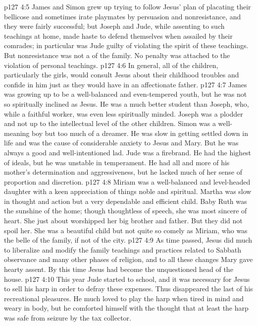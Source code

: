 \vs p127 4:5 James and Simon grew up trying to follow Jesus’ plan of placating their bellicose and sometimes irate playmates by persuasion and nonresistance, and they were fairly successful; but Joseph and Jude, while assenting to such teachings at home, made haste to defend themselves when assailed by their comrades; in particular was Jude guilty of violating the spirit of these teachings. But nonresistance was not a  of the family. No penalty was attached to the violation of personal teachings.
\vs p127 4:6 In general, all of the children, particularly the girls, would consult Jesus about their childhood troubles and confide in him just as they would have in an affectionate father.
\vs p127 4:7 James was growing up to be a well\hyp{}balanced and even\hyp{}tempered youth, but he was not so spiritually inclined as Jesus. He was a much better student than Joseph, who, while a faithful worker, was even less spiritually minded. Joseph was a plodder and not up to the intellectual level of the other children. Simon was a well\hyp{}meaning boy but too much of a dreamer. He was slow in getting settled down in life and was the cause of considerable anxiety to Jesus and Mary. But he was always a good and well\hyp{}intentioned lad. Jude was a firebrand. He had the highest of ideals, but he was unstable in temperament. He had all and more of his mother’s determination and aggressiveness, but he lacked much of her sense of proportion and discretion.
\vs p127 4:8 Miriam was a well\hyp{}balanced and level\hyp{}headed daughter with a keen appreciation of things noble and spiritual. Martha was slow in thought and action but a very dependable and efficient child. Baby Ruth was the sunshine of the home; though thoughtless of speech, she was most sincere of heart. She just about worshipped her big brother and father. But they did not spoil her. She was a beautiful child but not quite so comely as Miriam, who was the belle of the family, if not of the city.
\vs p127 4:9 \pc As time passed, Jesus did much to liberalize and modify the family teachings and practices related to Sabbath observance and many other phases of religion, and to all these changes Mary gave hearty assent. By this time Jesus had become the unquestioned head of the house.
\vs p127 4:10 This year Jude started to school, and it was necessary for Jesus to sell his harp in order to defray these expenses. Thus disappeared the last of his recreational pleasures. He much loved to play the harp when tired in mind and weary in body, but he comforted himself with the thought that at least the harp was safe from seizure by the tax collector.
